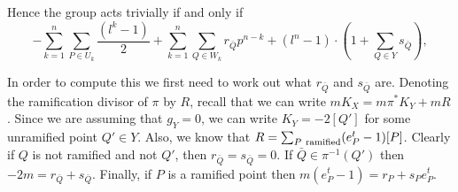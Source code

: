 \documentclass[11pt]{article} %
\theoremstyle{remark}\newtheorem*{rem}{Remark}
\begin{document}
 Hence the group acts trivially if and only if
\[
-\sum_{k=1}^n \sum_{P\in U_k} \frac{(l^k-1)}{2} + \sum_{k=1}^n \sum_{Q\in W_k} r_{\bar Q} p^{n-k} + (l^n-1)\cdot \left( 1 + \sum_{Q\in Y} s_{\bar Q} \right),
\]

In order to compute this we first need to work out what $r_{\bar Q}$ and $s_{\bar Q}$ are.
Denoting the ramification divisor of $\pi$ by $R$, recall that we can write $mK_X = m \pi^* K_Y + mR$.
Since we are assuming that $g_Y=0$, we can write $K_Y=-2[Q']$ for some unramified point $Q'\in Y$.
Also, we know that $R=\sum_{P\ {\rm ramified}} (e_P^t-1)[P]$.
Clearly if $Q$ is not ramified and not $Q'$, then $r_{\bar Q}=s_{\bar Q}=0$.
If $\bar Q \in \pi^{-1}(Q')$ then $-2m = r_{\bar Q} + s_{\bar Q}$.
Finally, if $P$ is a ramified point then $m(e_P^t-1)=r_P + s_Pe^t_P$.





\end{document}
